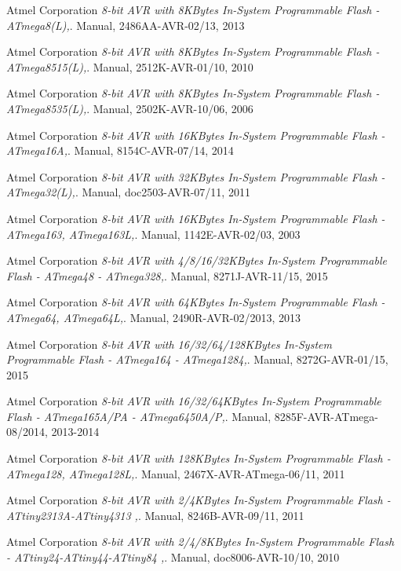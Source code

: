 \documentclass[pdftex,12pt,a4paper,oneside,english]{report}
\begin{document}
\begin{thebibliography}{99}

Atmel Corporation
\emph{8-bit AVR with 8KBytes In-System Programmable Flash - ATmega8(L),}.
Manual,
2486AA-AVR-02/13,
2013

Atmel Corporation
\emph{8-bit AVR with 8KBytes In-System Programmable Flash - ATmega8515(L),}.
Manual,
2512K-AVR-01/10,
2010

Atmel Corporation
\emph{8-bit AVR with 8KBytes In-System Programmable Flash - ATmega8535(L),}.
Manual,
2502K-AVR-10/06,
2006

Atmel Corporation
\emph{8-bit AVR with 16KBytes In-System Programmable Flash - ATmega16A,}.
Manual,
8154C-AVR-07/14,
2014

Atmel Corporation
\emph{8-bit AVR with 32KBytes In-System Programmable Flash - ATmega32(L),}.
Manual,
doc2503-AVR-07/11,
2011

Atmel Corporation
\emph{8-bit AVR with 16KBytes In-System Programmable Flash - ATmega163, ATmega163L,}.
Manual,
1142E-AVR-02/03,
2003

Atmel Corporation
\emph{8-bit AVR with 4/8/16/32KBytes In-System Programmable Flash - ATmega48 - ATmega328,}.
Manual,
8271J-AVR-11/15,
2015

Atmel Corporation
\emph{8-bit AVR with 64KBytes In-System Programmable Flash - ATmega64, ATmega64L,}.
Manual,
2490R-AVR-02/2013,
2013

Atmel Corporation
\emph{8-bit AVR with 16/32/64/128KBytes In-System Programmable Flash - ATmega164 - ATmega1284,}.
Manual,
8272G-AVR-01/15,
2015

Atmel Corporation
\emph{8-bit AVR with 16/32/64KBytes In-System Programmable Flash - ATmega165A/PA - ATmega6450A/P,}.
Manual,
8285F-AVR-ATmega-08/2014,
2013-2014

Atmel Corporation
\emph{8-bit AVR with 128KBytes In-System Programmable Flash - ATmega128, ATmega128L,}.
Manual,
2467X-AVR-ATmega-06/11,
2011

Atmel Corporation
\emph{8-bit AVR with 2/4KBytes In-System Programmable Flash - ATtiny2313A-ATtiny4313 ,}.
Manual,
8246B-AVR-09/11,
2011

Atmel Corporation
\emph{8-bit AVR with 2/4/8KBytes In-System Programmable Flash - ATtiny24-ATtiny44-ATtiny84 ,}.
Manual,
doc8006-AVR-10/10,
2010


\end{thebibliography}
\end{document}

